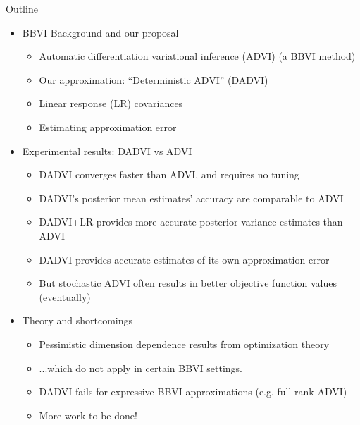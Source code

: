 \documentclass[8pt]{beamer}\usepackage[]{graphicx}\usepackage[]{color}
\begin{document}

\begin{frame}{Outline}
%
\begin{itemize}
    \item BBVI Background and our proposal
    \begin{itemize}
        \item Automatic differentiation variational inference (ADVI) (a BBVI method)
        \item Our approximation: ``Deterministic ADVI'' (DADVI)
        \item Linear response (LR) covariances
        \item Estimating approximation error
    \end{itemize}
    \item Experimental results: DADVI vs ADVI
    \begin{itemize}
        \item DADVI converges faster than ADVI, and requires no tuning
        \item DADVI's posterior mean estimates' accuracy are comparable to ADVI
        \item DADVI+LR provides more accurate posterior variance estimates than ADVI
        \item DADVI provides accurate estimates of its own approximation error
        \item But stochastic ADVI often results in better objective function values (eventually)
    \end{itemize}
    \item Theory and shortcomings
    \begin{itemize}
        \item Pessimistic dimension dependence results from optimization theory
        \item ...which do not apply in certain BBVI settings.
        \item DADVI fails for expressive BBVI approximations (e.g. full-rank ADVI)
        \item More work to be done!
    \end{itemize}
\end{itemize}
%
\end{frame}
\end{document}
